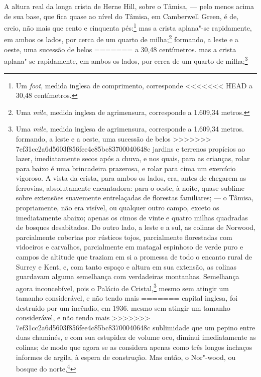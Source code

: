 {{{{{{{{{{{{{{{%
A altura real da longa crista de Herne Hill, sobre o Tâmisa, --- pelo
menos acima de sua base, que fica quase ao nível do Tâmisa, em
Camberwell Green, é de, creio, não mais que cento e cinquenta
pés:\footnote{Um \textit{foot}, medida inglesa de comprimento, corresponde
<<<<<<< HEAD
  a 30,48 centímetros.} mas a crista aplana"-se rapidamente, em
ambos os lados, por cerca de um quarto de milha;\footnote{Uma
  \textit{mile}, medida inglesa de agrimensura, corresponde a 1.609,34 metros.} formando, a leste e a oeste, uma sucessão de belos
=======
  a 30,48 centímetros.  mas a crista aplana"-se rapidamente, em
ambos os lados, por cerca de um quarto de milha;\footnote{Uma
  \textit{mile}, medida inglesa de agrimensura, corresponde a 1.609,34 metros.
   formando, a leste e a oeste, uma sucessão de belos
>>>>>>> 7ef31cc2a6d5603f856fee4c85bc83700040648c
jardins e terrenos propícios ao lazer, imediatamente secos após a chuva,
e nos quais, para as crianças, rolar para baixo é uma brincadeira
prazerosa, e rolar para cima um exercício vigoroso. A vista da crista,
para ambos os lados, era, antes de chegarem as ferrovias, absolutamente
encantadora: para o oeste, à noite, quase sublime sobre extensões
suavemente entrelaçadas de florestas familiares; --- o Tâmisa,
propriamente, não era visível, ou qualquer outro campo, exceto os
imediatamente abaixo; apenas os cimos de vinte e quatro milhas quadradas
de bosques desabitados. Do outro lado, a leste e a sul, as colinas de
Norwood, parcialmente cobertas por rústicos tojos, parcialmente
florestadas com vidoeiros e carvalhos, parcialmente em matagal espinhoso
de verde puro e campos de altitude que traziam em si a promessa de todo
o encanto rural de Surrey e Kent, e, com tanto espaço e altura em sua
extensão, as colinas guardavam alguma semelhança com verdadeiras
montanhas. Semelhança agora inconcebível, pois o Palácio de
Cristal,\footnote{Construção em ferro e vidro erguida para a Exposição
  Universal de Londres, em 1851; transportado para a periferia da
<<<<<<< HEAD
  capital inglesa, foi destruído por um incêndio, em 1936.} mesmo sem atingir um tamanho considerável, e não tendo mais
=======
  capital inglesa, foi destruído por um incêndio, em 1936.  mesmo sem atingir um tamanho considerável, e não tendo mais
>>>>>>> 7ef31cc2a6d5603f856fee4c85bc83700040648c
sublimidade que um pepino entre duas chaminés, e com sua estupidez de
volume oco, diminui imediatamente as colinas; de modo que agora se as
considera apenas como três longos inchaços informes de argila, à espera
de construção. Mas então, o Nor"-wood, ou bosque do norte,\footnote{``North"-wood'',
}}}}}}}}}}}}}}}}}
